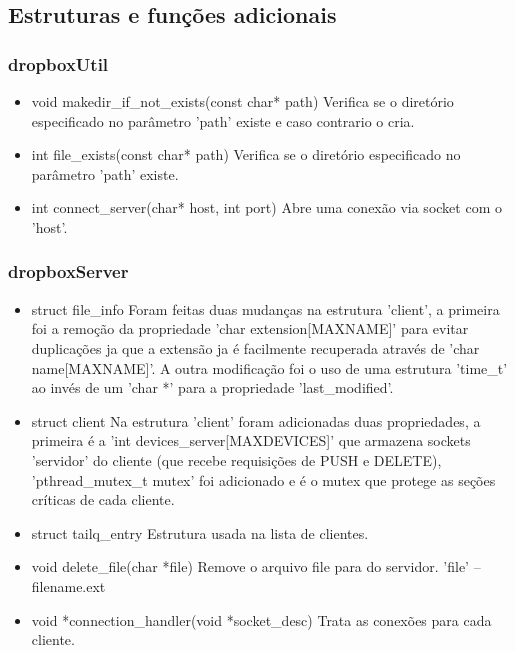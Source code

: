 \documentclass[a4paper]{article}
\begin{document}
\subsection{Estruturas e funções adicionais}

\subsubsection{dropboxUtil}
\begin{itemize}
	\item void makedir\_if\_not\_exists(const char* path)
	\newline Verifica se o diretório especificado no parâmetro 'path' existe e caso contrario o cria.
	
	\item int file\_exists(const char* path)
	\newline Verifica se o diretório especificado no parâmetro 'path' existe.

	\item int connect\_server(char* host, int port)
	\newline Abre uma conexão via socket com o 'host'.
\end{itemize}


\subsubsection{dropboxServer}
\begin{itemize}
	\item struct file\_info
	\newline Foram feitas duas mudanças na estrutura 'client', a primeira foi a remoção da propriedade 'char extension[MAXNAME]' para evitar duplicações ja que a extensão ja é facilmente recuperada através de 'char name[MAXNAME]'. A outra modificação foi o uso de uma estrutura 'time\_t' ao invés de um 'char *' para a propriedade 'last\_modified'.
	
	\item struct client
	\newline Na estrutura 'client' foram adicionadas duas propriedades, a primeira é a 'int devices\_server[MAXDEVICES]' que armazena sockets 'servidor' do cliente (que recebe requisições de PUSH e DELETE), 'pthread\_mutex\_t mutex' foi adicionado e é o mutex que protege as seções críticas de cada cliente.
	
	\item struct tailq\_entry
	\newline Estrutura usada na lista de clientes.
	
	\item void delete\_file(char *file)
	\newline Remove o arquivo file para do servidor. 'file' – filename.ext
	
	\item void *connection\_handler(void *socket\_desc)
	\newline Trata as conexões para cada cliente.

\end{itemize}
\end{document}
